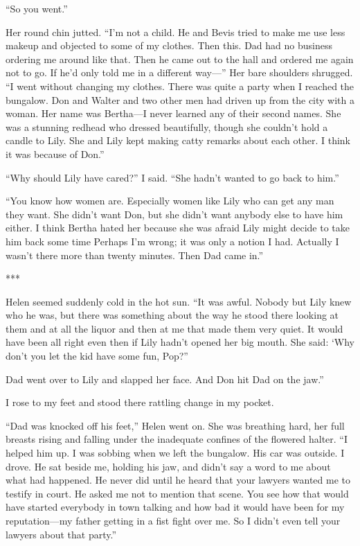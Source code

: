 \documentclass{novel}
\begin{document}
{“So you went.”

Her round chin jutted. “I’m not a child. He and Bevis tried to make me use less makeup and objected to some of my clothes. Then this. Dad had no business ordering me around like that. Then he came out to the hall and ordered me again not to go. If he’d only told me in a different way—” Her bare shoulders shrugged. “I went without changing my clothes. There was quite a party when I reached the bungalow. Don and Walter and two other men had driven up from the city with a woman. Her name was Bertha—I never learned any of their second names. She was a stunning redhead who dressed beautifully, though she couldn’t hold a candle to Lily. She and Lily kept making catty remarks about each other. I think it was because of Don.”

“Why should Lily have cared?” I said. “She hadn’t wanted to go back to him.”

“You know how women are. Especially women like Lily who can get any man they want. She didn’t want Don, but she didn’t want anybody else to have him either. I think Bertha hated her because she was afraid Lily might decide to take him back some time Perhaps I’m wrong; it was only a notion I had. Actually I wasn’t there more than twenty minutes. Then Dad came in.”

***

Helen seemed suddenly cold in the hot sun. “It was awful. Nobody but Lily knew who he was, but there was something about the way he stood there looking at them and at all the liquor and then at me that made them very quiet. It would have been all right even then if Lily hadn’t opened her big mouth. She said: ‘Why don’t you let the kid have some fun, Pop?”

Dad went over to Lily and slapped her face. And Don hit Dad on the jaw.”

I rose to my feet and stood there rattling change in my pocket.

“Dad was knocked off his feet,” Helen went on. She was breathing hard, her full breasts rising and falling under the inadequate confines of the flowered halter. “I helped him up. I was sobbing when we left the bungalow. His car was outside. I drove. He sat beside me, holding his jaw, and didn’t say a word to me about what had happened. He never did until he heard that your lawyers wanted me to testify in court. He asked me not to mention that scene. You see how that would have started everybody in town talking and how bad it would have been for my reputation—my father getting in a fist fight over me. So I didn’t even tell your lawyers about that party.”

}
\end{document}
